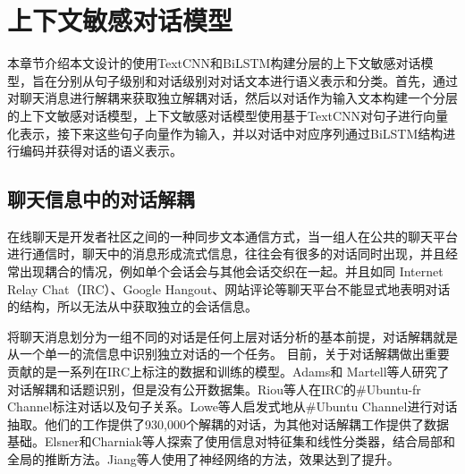 \chapter{上下文敏感对话模型}
本章节介绍本文设计的使用TextCNN和BiLSTM构建分层的上下文敏感对话模型，旨在分别从句子级别和对话级别对对话文本进行语义表示和分类。首先，通过对聊天消息进行解耦来获取独立解耦对话，然后以对话作为输入文本构建一个分层的上下文敏感对话模型，上下文敏感对话模型使用基于TextCNN\cite{kim2014convolutional}对句子进行向量化表示，接下来这些句子向量作为输入，并以对话中对应序列通过BiLSTM\cite{graves2013speech}结构进行编码并获得对话的语义表示。


\section{聊天信息中的对话解耦}
在线聊天是开发者社区之间的一种同步文本通信方式，当一组人在公共的聊天平台进行通信时，聊天中的消息形成流式信息，往往会有很多的对话同时出现，并且经常出现耦合的情况，例如单个会话会与其他会话交织在一起。并且如同 Internet Relay Chat（IRC）、Google Hangout、网站评论等聊天平台不能显式地表明对话的结构，所以无法从中获取独立的会话信息。

将聊天消息划分为一组不同的对话是任何上层对话分析的基本前提，对话解耦就是从一个单一的流信息中识别独立对话的一个任务。
目前，关于对话解耦做出重要贡献的是一系列在IRC上标注的数据和训练的模型。Adams和 Martell等人\cite{adams2008topic}研究了对话解耦和话题识别，但是没有公开数据集。Riou等人\cite{riou2015using}在IRC的\#Ubuntu-fr Channel标注对话以及句子关系。Lowe等人\cite{lasecki2013conversations}启发式地从\#Ubuntu Channel进行对话抽取。他们的工作提供了930,000个解耦的对话，为其他对话解耦工作提供了数据基础。Elsner和Charniak等人\cite{elsner2008you}探索了使用信息对特征集和线性分类器，结合局部和全局的推断方法。Jiang等人\cite{jiang2018learning}使用了神经网络的方法，效果达到了提升。

